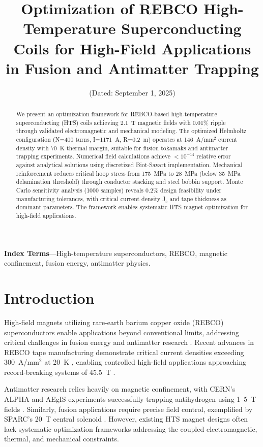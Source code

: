 \documentclass[10pt,twocolumn]{article}
\title{\Large\bfseries Optimization of REBCO High-Temperature Superconducting Coils for High-Field Applications in Fusion and Antimatter Trapping}
\author{\authorname}
\affil{Independent Researcher\thanks{Electronic address: \texttt{\authoremail}.}}
\date{(Dated: September 1, 2025)}
\begin{document}
\makeatletter
\renewcommand\@makefntext[1]{%
  \noindent\makebox[1.8em][l]{\@makefnmark}#1%
}
\makeatother

\maketitle

\begin{abstract}
We present an optimization framework for REBCO-based high-temperature superconducting (HTS) coils achieving 2.1~T magnetic fields with 0.01\% ripple through validated electromagnetic and mechanical modeling. The optimized Helmholtz configuration (N=400 turns, I=1171~A, R=0.2~m) operates at 146~A/mm$^2$ current density with 70~K thermal margin, suitable for fusion tokamaks and antimatter trapping experiments. Numerical field calculations achieve $<10^{-14}$ relative error against analytical solutions using discretized Biot-Savart implementation. Mechanical reinforcement reduces critical hoop stress from 175~MPa to 28~MPa (below 35~MPa delamination threshold) through conductor stacking and steel bobbin support. Monte Carlo sensitivity analysis (1000 samples) reveals 0.2\% design feasibility under manufacturing tolerances, with critical current density J$_c$ and tape thickness as dominant parameters. The framework enables systematic HTS magnet optimization for high-field applications.
\end{abstract}

\textbf{Index Terms}---High-temperature superconductors, REBCO, magnetic confinement, fusion energy, antimatter physics.

\section{Introduction}

High-field magnets utilizing rare-earth barium copper oxide (REBCO) superconductors enable applications beyond conventional limits, addressing critical challenges in fusion energy and antimatter research \cite{zhou2023}. Recent advances in REBCO tape manufacturing demonstrate critical current densities exceeding 300~A/mm$^2$ at 20~K \cite{superpower2022}, enabling controlled high-field applications approaching record-breaking systems of 45.5~T \cite{hahn2019}.

Antimatter research relies heavily on magnetic confinement, with CERN's ALPHA and AEgIS experiments successfully trapping antihydrogen using 1--5~T fields \cite{alpha2023,aegis2018}. Similarly, fusion applications require precise field control, exemplified by SPARC's 20~T central solenoid \cite{sparc2020}. However, existing HTS magnet designs often lack systematic optimization frameworks addressing the coupled electromagnetic, thermal, and mechanical constraints.
\end{document}
